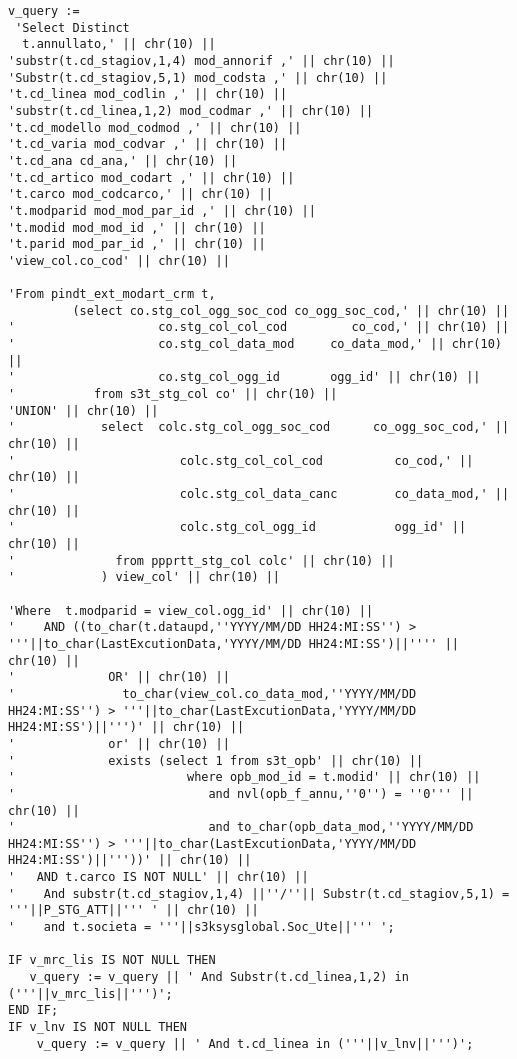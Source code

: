 \begin{lstlisting}
v_query :=
 'Select Distinct
  t.annullato,' || chr(10) ||
'substr(t.cd_stagiov,1,4) mod_annorif ,' || chr(10) ||
'Substr(t.cd_stagiov,5,1) mod_codsta ,' || chr(10) ||
't.cd_linea mod_codlin ,' || chr(10) ||
'substr(t.cd_linea,1,2) mod_codmar ,' || chr(10) ||
't.cd_modello mod_codmod ,' || chr(10) ||
't.cd_varia mod_codvar ,' || chr(10) ||
't.cd_ana cd_ana,' || chr(10) ||
't.cd_artico mod_codart ,' || chr(10) ||
't.carco mod_codcarco,' || chr(10) ||
't.modparid mod_mod_par_id ,' || chr(10) ||
't.modid mod_mod_id ,' || chr(10) ||
't.parid mod_par_id ,' || chr(10) ||
'view_col.co_cod' || chr(10) ||

'From pindt_ext_modart_crm t, 
         (select co.stg_col_ogg_soc_cod co_ogg_soc_cod,' || chr(10) ||
'                    co.stg_col_col_cod         co_cod,' || chr(10) ||
'                    co.stg_col_data_mod     co_data_mod,' || chr(10) ||
'                    co.stg_col_ogg_id       ogg_id' || chr(10) ||
'           from s3t_stg_col co' || chr(10) ||
'UNION' || chr(10) ||
'            select  colc.stg_col_ogg_soc_cod      co_ogg_soc_cod,' || chr(10) ||
'                       colc.stg_col_col_cod          co_cod,' || chr(10) ||
'                       colc.stg_col_data_canc        co_data_mod,' || chr(10) ||
'                       colc.stg_col_ogg_id           ogg_id' || chr(10) ||
'              from ppprtt_stg_col colc' || chr(10) ||
'            ) view_col' || chr(10) ||

'Where  t.modparid = view_col.ogg_id' || chr(10) ||
'    AND ((to_char(t.dataupd,''YYYY/MM/DD HH24:MI:SS'') > '''||to_char(LastExcutionData,'YYYY/MM/DD HH24:MI:SS')||'''' || chr(10) ||
'             OR' || chr(10) ||
'               to_char(view_col.co_data_mod,''YYYY/MM/DD HH24:MI:SS'') > '''||to_char(LastExcutionData,'YYYY/MM/DD HH24:MI:SS')||''')' || chr(10) ||
'             or' || chr(10) ||
'             exists (select 1 from s3t_opb' || chr(10) ||
'                        where opb_mod_id = t.modid' || chr(10) ||
'                           and nvl(opb_f_annu,''0'') = ''0''' || chr(10) ||
'                           and to_char(opb_data_mod,''YYYY/MM/DD HH24:MI:SS'') > '''||to_char(LastExcutionData,'YYYY/MM/DD HH24:MI:SS')||'''))' || chr(10) ||
'   AND t.carco IS NOT NULL' || chr(10) ||
'    And substr(t.cd_stagiov,1,4) ||''/''|| Substr(t.cd_stagiov,5,1) = '''||P_STG_ATT||''' ' || chr(10) ||
'    and t.societa = '''||s3ksysglobal.Soc_Ute||''' ';

IF v_mrc_lis IS NOT NULL THEN
   v_query := v_query || ' And Substr(t.cd_linea,1,2) in ('''||v_mrc_lis||''')';
END IF;
IF v_lnv IS NOT NULL THEN
    v_query := v_query || ' And t.cd_linea in ('''||v_lnv||''')';
    

\end{lstlisting}
